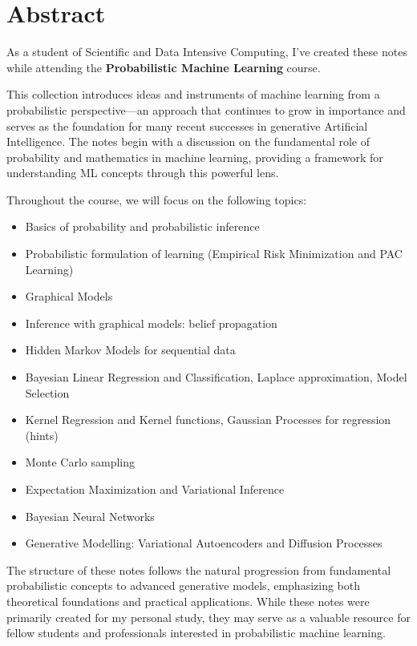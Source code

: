 \chapter*{Abstract}

As a student of Scientific and Data Intensive Computing, I've created these notes while attending the \textbf{Probabilistic Machine Learning} course.

\vspace{1em}

This collection introduces ideas and instruments of machine learning from a probabilistic perspective—an approach that continues to grow in importance and serves as the foundation for many recent successes in generative Artificial Intelligence. The notes begin with a discussion on the fundamental role of probability and mathematics in machine learning, providing a framework for understanding ML concepts through this powerful lens.

\vspace{1em}

Throughout the course, we will focus on the following topics:

\begin{itemize}
    \item Basics of probability and probabilistic inference
    \item Probabilistic formulation of learning (Empirical Risk Minimization and PAC Learning)
    \item Graphical Models
    \item Inference with graphical models: belief propagation
    \item Hidden Markov Models for sequential data
    \item Bayesian Linear Regression and Classification, Laplace approximation, Model Selection
    \item Kernel Regression and Kernel functions, Gaussian Processes for regression (hints)
    \item Monte Carlo sampling
    \item Expectation Maximization and Variational Inference
    \item Bayesian Neural Networks
    \item Generative Modelling: Variational Autoencoders and Diffusion Processes
\end{itemize}

\vspace{1em}

The structure of these notes follows the natural progression from fundamental probabilistic concepts to advanced generative models, emphasizing both theoretical foundations and practical applications. While these notes were primarily created for my personal study, they may serve as a valuable resource for fellow students and professionals interested in probabilistic machine learning.